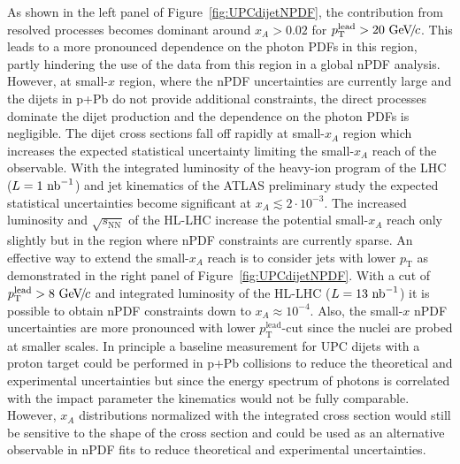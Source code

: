 \documentclass[../report.tex]{subfiles}
\begin{document}
As shown in the left panel of Figure~\ref{fig:UPCdijetNPDF}, the contribution from resolved processes becomes dominant around $x_A > 0.02$ for $p_{\mathrm{T}}^{\mathrm{lead}}>20~\text{GeV}\!/\mspace{-2mu}c$. This leads to a more pronounced dependence on the photon PDFs in this region, partly hindering the use of the data from this region in a global nPDF analysis. However, at small-$x$ region, where the nPDF uncertainties are currently large and the dijets in p+Pb do not provide additional constraints, the direct processes dominate the dijet production and the dependence on the photon PDFs is negligible. The dijet cross sections fall off rapidly at small-$x_A$ region which increases the expected statistical uncertainty limiting the small-$x_A$ reach of the observable. With the integrated luminosity of the heavy-ion program of the LHC ($L=1~\text{nb}^{-1}$) and jet kinematics of the ATLAS preliminary study the expected statistical uncertainties become significant at $x_A \lesssim 2 \cdot 10^{-3}$. The increased luminosity and $\sqrt{s_{\mathrm{NN}}}$ of the HL-LHC increase the potential small-$x_A$ reach only slightly but in the region where nPDF constraints are currently sparse. An effective way to extend the small-$x_A$ reach is to consider jets with lower $p_{\mathrm{T}}$ as demonstrated in the right panel of Figure~\ref{fig:UPCdijetNPDF}. With a cut of $p_{\mathrm{T}}^{\mathrm{lead}}>8~\text{GeV}\!/\mspace{-2mu}c$ and integrated luminosity of the HL-LHC ($L=13~\text{nb}^{-1}$) it is possible to obtain nPDF constraints down to $x_A \approx 10^{-4}$.  Also, the small-$x$ nPDF uncertainties are more pronounced with lower $p_{\mathrm{T}}^{\mathrm{lead}}$-cut since the nuclei are probed at smaller scales. In principle a baseline measurement for UPC dijets with a proton target could be performed in p+Pb collisions to reduce the theoretical and experimental uncertainties but since the energy spectrum of photons is correlated with the impact parameter the kinematics would not be fully comparable. However, $x_A$ distributions normalized with the integrated cross section would still be sensitive to the shape of the cross section and could be used as an alternative observable in nPDF fits to reduce theoretical and experimental uncertainties.
\end{document}
